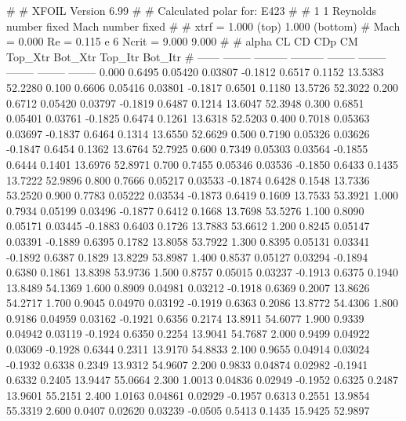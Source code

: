 #  
#       XFOIL         Version 6.99
#  
# Calculated polar for: E423                                            
#  
# 1 1 Reynolds number fixed          Mach number fixed         
#  
# xtrf =   1.000 (top)        1.000 (bottom)  
# Mach =   0.000     Re =     0.115 e 6     Ncrit =   9.000  9.000
#  
#   alpha    CL        CD       CDp       CM     Top_Xtr  Bot_Xtr  Top_Itr  Bot_Itr
#  ------ -------- --------- --------- -------- -------- -------- -------- --------
   0.000   0.6495   0.05420   0.03807  -0.1812   0.6517   0.1152  13.5383  52.2280
   0.100   0.6606   0.05416   0.03801  -0.1817   0.6501   0.1180  13.5726  52.3022
   0.200   0.6712   0.05420   0.03797  -0.1819   0.6487   0.1214  13.6047  52.3948
   0.300   0.6851   0.05401   0.03761  -0.1825   0.6474   0.1261  13.6318  52.5203
   0.400   0.7018   0.05363   0.03697  -0.1837   0.6464   0.1314  13.6550  52.6629
   0.500   0.7190   0.05326   0.03626  -0.1847   0.6454   0.1362  13.6764  52.7925
   0.600   0.7349   0.05303   0.03564  -0.1855   0.6444   0.1401  13.6976  52.8971
   0.700   0.7455   0.05346   0.03536  -0.1850   0.6433   0.1435  13.7222  52.9896
   0.800   0.7666   0.05217   0.03533  -0.1874   0.6428   0.1548  13.7336  53.2520
   0.900   0.7783   0.05222   0.03534  -0.1873   0.6419   0.1609  13.7533  53.3921
   1.000   0.7934   0.05199   0.03496  -0.1877   0.6412   0.1668  13.7698  53.5276
   1.100   0.8090   0.05171   0.03445  -0.1883   0.6403   0.1726  13.7883  53.6612
   1.200   0.8245   0.05147   0.03391  -0.1889   0.6395   0.1782  13.8058  53.7922
   1.300   0.8395   0.05131   0.03341  -0.1892   0.6387   0.1829  13.8229  53.8987
   1.400   0.8537   0.05127   0.03294  -0.1894   0.6380   0.1861  13.8398  53.9736
   1.500   0.8757   0.05015   0.03237  -0.1913   0.6375   0.1940  13.8489  54.1369
   1.600   0.8909   0.04981   0.03212  -0.1918   0.6369   0.2007  13.8626  54.2717
   1.700   0.9045   0.04970   0.03192  -0.1919   0.6363   0.2086  13.8772  54.4306
   1.800   0.9186   0.04959   0.03162  -0.1921   0.6356   0.2174  13.8911  54.6077
   1.900   0.9339   0.04942   0.03119  -0.1924   0.6350   0.2254  13.9041  54.7687
   2.000   0.9499   0.04922   0.03069  -0.1928   0.6344   0.2311  13.9170  54.8833
   2.100   0.9655   0.04914   0.03024  -0.1932   0.6338   0.2349  13.9312  54.9607
   2.200   0.9833   0.04874   0.02982  -0.1941   0.6332   0.2405  13.9447  55.0664
   2.300   1.0013   0.04836   0.02949  -0.1952   0.6325   0.2487  13.9601  55.2151
   2.400   1.0163   0.04861   0.02929  -0.1957   0.6313   0.2551  13.9854  55.3319
   2.600   0.0407   0.02620   0.03239  -0.0505   0.5413   0.1435  15.9425  52.9897
